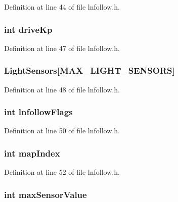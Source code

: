Definition at line 44 of file lnfollow.h.

\hypertarget{struct_l_n_f_o_l_l_o_w_a48762fd552af5541e8ce1c9dd65b44bd}{
\subsubsection[{driveKp}]{\setlength{\rightskip}{0pt plus 5cm}int {\bf driveKp}}}
\label{struct_l_n_f_o_l_l_o_w_a48762fd552af5541e8ce1c9dd65b44bd}


Definition at line 47 of file lnfollow.h.

\hypertarget{struct_l_n_f_o_l_l_o_w_a4629217ceda0d2a4e91c1ad0d6a1940f}{
\subsubsection[{LightSensors}]{ {\bf LightSensors}\mbox{[}MAX\_\-LIGHT\_\-SENSORS\mbox{]}}}
\label{struct_l_n_f_o_l_l_o_w_a4629217ceda0d2a4e91c1ad0d6a1940f}


Definition at line 48 of file lnfollow.h.

\hypertarget{struct_l_n_f_o_l_l_o_w_a16ed34094276f6e01055d4475b4a5982}{
\subsubsection[{lnfollowFlags}]{\setlength{\rightskip}{0pt plus 5cm}int {\bf lnfollowFlags}}}
\label{struct_l_n_f_o_l_l_o_w_a16ed34094276f6e01055d4475b4a5982}


Definition at line 50 of file lnfollow.h.

\hypertarget{struct_l_n_f_o_l_l_o_w_aa168394544470246a291557687cc0abb}{
\subsubsection[{mapIndex}]{\setlength{\rightskip}{0pt plus 5cm}int {\bf mapIndex}}}
\label{struct_l_n_f_o_l_l_o_w_aa168394544470246a291557687cc0abb}


Definition at line 52 of file lnfollow.h.

\hypertarget{struct_l_n_f_o_l_l_o_w_add30ac34390161c065449682bb85d6d9}{
\subsubsection[{maxSensorValue}]{\setlength{\rightskip}{0pt plus 5cm}int {\bf maxSensorValue}}}
\label{struct_l_n_f_o_l_l_o_w_add30ac34390161c065449682bb85d6d9}


